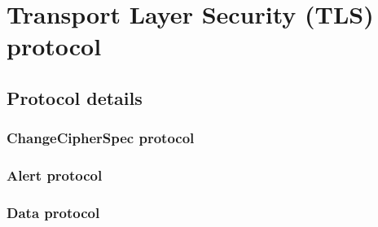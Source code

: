 \chapter{Transport Layer Security (TLS) protocol}










\section{Protocol details}



\subsection{ChangeCipherSpec protocol}
\subsection{Alert protocol}
\subsection{Data protocol}


